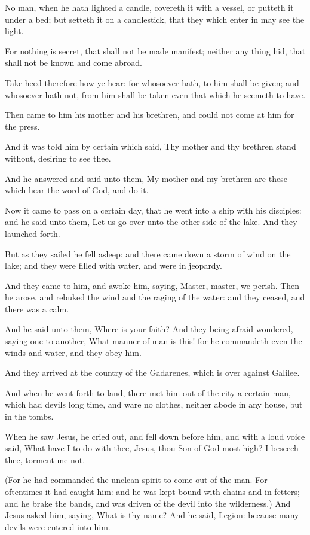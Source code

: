 \verse No man, when he hath lighted a candle, covereth it with a vessel, or putteth it under a bed; but setteth it on a candlestick, that they which enter in may see the light.

\verse For nothing is secret, that shall not be made manifest; neither any thing hid, that shall not be known and come abroad.

\verse Take heed therefore how ye hear: for whosoever hath, to him shall be given; and whosoever hath not, from him shall be taken even that which he seemeth to have.

\verse Then came to him his mother and his brethren, and could not come at him for the press.

\verse And it was told him by certain which said, Thy mother and thy brethren stand without, desiring to see thee.

\verse And he answered and said unto them, My mother and my brethren are these which hear the word of God, and do it.

\verse Now it came to pass on a certain day, that he went into a ship with his disciples: and he said unto them, Let us go over unto the other side of the lake. And they launched forth.

\verse But as they sailed he fell asleep: and there came down a storm of wind on the lake; and they were filled with water, and were in jeopardy.

\verse And they came to him, and awoke him, saying, Master, master, we perish. Then he arose, and rebuked the wind and the raging of the water: and they ceased, and there was a calm.

\verse And he said unto them, Where is your faith? And they being afraid wondered, saying one to another, What manner of man is this! for he commandeth even the winds and water, and they obey him.

\verse And they arrived at the country of the Gadarenes, which is over against Galilee.

\verse And when he went forth to land, there met him out of the city a certain man, which had devils long time, and ware no clothes, neither abode in any house, but in the tombs.

\verse When he saw Jesus, he cried out, and fell down before him, and with a loud voice said, What have I to do with thee, Jesus, thou Son of God most high? I beseech thee, torment me not.

\verse (For he had commanded the unclean spirit to come out of the man.  For oftentimes it had caught him: and he was kept bound with chains and in fetters; and he brake the bands, and was driven of the devil into the wilderness.)  \verse And Jesus asked him, saying, What is thy name? And he said, Legion: because many devils were entered into him.

